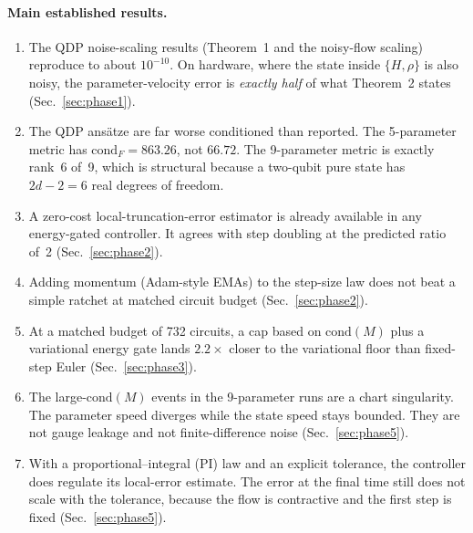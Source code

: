 \documentclass[aps,pra,reprint,superscriptaddress,nofootinbib]{revtex4-2}
\newcommand{\cond}{\mathrm{cond}}
\begin{document}
\paragraph*{Main established results.}
\begin{enumerate}
\setlength\itemsep{0pt}
\item The QDP noise-scaling results (Theorem~1 and the noisy-flow scaling) reproduce to about
  $10^{-10}$. On hardware, where the state inside $\{H,\rho\}$ is also noisy, the parameter-velocity
  error is \emph{exactly half} of what Theorem~2 states (Sec.~\ref{sec:phase1}).
\item The QDP ansätze are far worse conditioned than reported. The 5-parameter metric has
  $\cond_F=863.26$, not $66.72$. The 9-parameter metric is exactly rank~6 of~9, which is
  structural because a two-qubit pure state has $2d-2=6$ real degrees of freedom.
\item A zero-cost local-truncation-error estimator is already available in any energy-gated
  controller. It agrees with step doubling at the predicted ratio of~2 (Sec.~\ref{sec:phase2}).
\item Adding momentum (Adam-style EMAs) to the step-size law does not beat a simple ratchet at
  matched circuit budget (Sec.~\ref{sec:phase2}).
\item At a matched budget of 732 circuits, a cap based on $\cond(M)$ plus a variational energy gate lands $2.2\times$
  closer to the variational floor than fixed-step Euler (Sec.~\ref{sec:phase3}).
\item The large-$\cond(M)$ events in the 9-parameter runs are a chart singularity. The
  parameter speed diverges while the state speed stays bounded. They are not gauge leakage and
  not finite-difference noise (Sec.~\ref{sec:phase5}).
\item With a proportional--integral (PI) law and an explicit tolerance, the controller does
  regulate its local-error estimate. The error at the final time still does not scale with
  the tolerance, because the flow is contractive and the first step is fixed
  (Sec.~\ref{sec:phase5}).
\end{enumerate}
\end{document}
